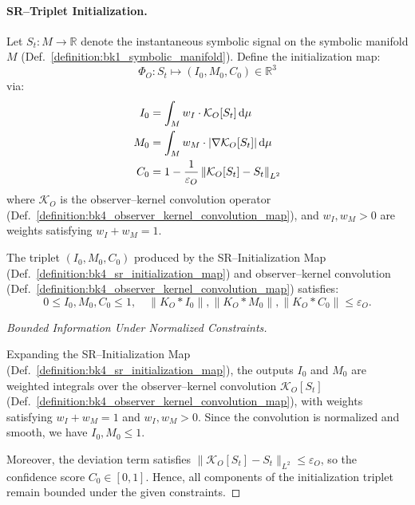 \paragraph{SR--Triplet Initialization.}
\begin{definition}
\label{definition:bk4_sr_initialization_map}

Let $S_t \colon M \to \mathbb{R}$ denote the instantaneous symbolic signal on the symbolic manifold $M$ (Def.~\ref{definition:bk1_symbolic_manifold}).
Define the initialization map:
\[
\Phi_O \colon S_t \longmapsto (I_0, M_0, C_0) \in \mathbb{R}^3
\]
via:
\begin{align}
I_0 &= \int_M w_I \cdot \mathcal{K}_O[S_t]\, \mathrm{d}\mu \notag \\
M_0 &= \int_M w_M \cdot |\nabla \mathcal{K}_O[S_t]|\, \mathrm{d}\mu \notag \\
C_0 &= 1 - \frac{1}{\varepsilon_O} \left\| \mathcal{K}_O[S_t] - S_t \right\|_{L^2} \notag
\end{align}
where $\mathcal{K}_O$ is the observer--kernel convolution operator (Def.~\ref{definition:bk4_observer_kernel_convolution_map}), and $w_I, w_M > 0$ are weights satisfying $w_I + w_M = 1$.
\end{definition}
\begin{proposition}
\label{proposition:bk4_bounded_sr_initial_state}
The triplet $(I_0, M_0, C_0)$ produced by the SR--Initialization Map (Def.~\ref{definition:bk4_sr_initialization_map}) and observer--kernel convolution (Def.~\ref{definition:bk4_observer_kernel_convolution_map}) satisfies:
\[
0 \leq I_0, M_0, C_0 \leq 1, \quad
\|K_O * I_0\|, \|K_O * M_0\|, \|K_O * C_0\| \leq \varepsilon_O.
\]
\end{proposition}
\begin{proof}[Bounded Information Under Normalized Constraints]
\label{proof:bk4_normalization_bounds}
\leavevmode

Expanding the SR--Initialization Map (Def.~\ref{definition:bk4_sr_initialization_map}),
the outputs $I_0$ and $M_0$ are weighted integrals over the observer--kernel convolution
$\mathcal{K}_O[S_t]$ (Def.~\ref{definition:bk4_observer_kernel_convolution_map}), with weights satisfying $w_I + w_M = 1$ and $w_I, w_M > 0$. Since the convolution is normalized and smooth, we have \( I_0, M_0 \leq 1 \).

Moreover, the deviation term satisfies $\| \mathcal{K}_O[S_t] - S_t \|_{L^2} \leq \varepsilon_O$, so the confidence score $C_0 \in [0, 1]$. Hence, all components of the initialization triplet remain bounded under the given constraints.
\end{proof}
